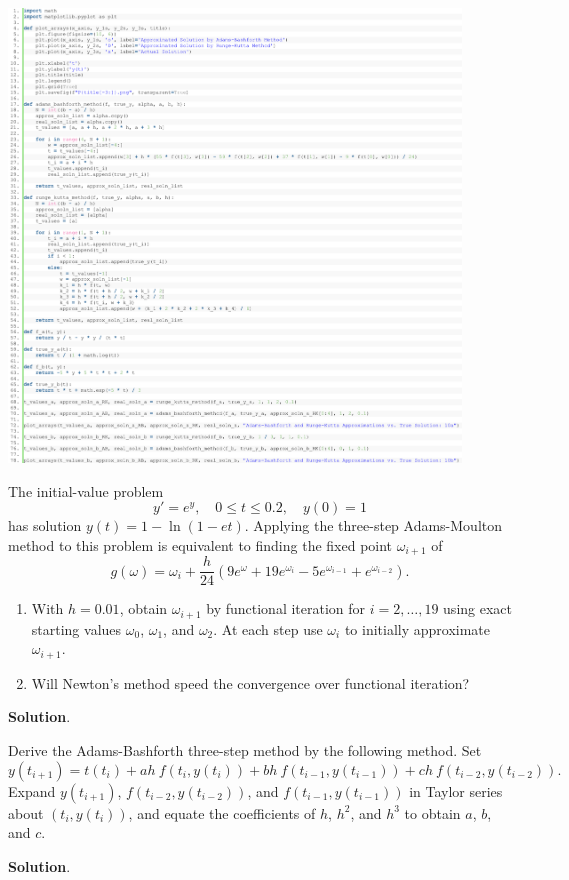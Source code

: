 \documentclass[11pt]{article}
\theoremstyle{break}
\numberwithin{equation}{theorem}
\begin{document}
\begin{center}
    \includegraphics[width=0.9\textwidth]{P10.png}
\end{center}


\newpage
\begin{problem}\label{problem 11} %
    The initial-value problem $$y'=e^y, \quad 0\leq t\leq 0.2, \quad y(0)=1$$ has solution $y(t)=1-\ln(1-et)$. Applying the three-step Adams-Moulton method to this problem is equivalent to finding the fixed point $\omega_{i+1}$ of $$g(\omega)=\omega_i+\dfrac{h}{24}\left(9e^\omega+19e^{\omega_i}-5e^{\omega_{i-1}}+e^{\omega_{i-2}}\right).$$
    \begin{enumerate}
        \item With $h = 0.01$, obtain $\omega_{i+1}$ by functional iteration for $i = 2, \dots , 19$ using exact starting values $\omega_0$, $\omega_1$, and $\omega_2$. At each step use $\omega_i$ to initially approximate $\omega_{i+1}$.
        \item Will Newton's method speed the convergence over functional iteration?
    \end{enumerate}
\end{problem}
\textbf{Solution}. 


\newpage
\begin{problem}\label{problem 12} %
    Derive the Adams-Bashforth three-step method by the following method. Set $$y(t_{i+1})=t(t_i)+ah\:f(t_i, y(t_i))+bh\:f(t_{i-1}, y(t_{i-1}))+ch\:f(t_{i-2}, y(t_{i-2})).$$ Expand $y(t_{i+1})$, $f(t_{i-2}, y(t_{i-2}))$, and $f(t_{i-1}, y(t_{i-1}))$ in Taylor series about $(t_i, y(t_i))$, and equate the coefficients of $h$, $h^2$, and $h^3$ to obtain $a$, $b$, and $c$.
\end{problem}
\textbf{Solution}. 
\end{document}
